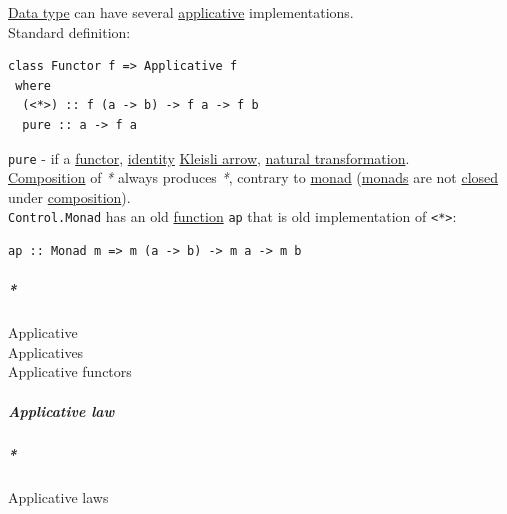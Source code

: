 \documentclass[11pt]{article}
\begin{document}
\hyperref[org965cde3]{Data type} can have several \hyperref[org24a6930]{applicative} implementations.\\

Standard definition:\\
\begin{verbatim}
class Functor f => Applicative f
 where
  (<*>) :: f (a -> b) -> f a -> f b
  pure :: a -> f a
\end{verbatim}

\texttt{pure} - if a \hyperref[org6073683]{functor}, \hyperref[org3bbbadd]{identity} \hyperref[org4db73e5]{Kleisli arrow}, \hyperref[org381dd2b]{natural transformation}.\\

\hyperref[org24a8abd]{Composition} of \emph{*} always produces \emph{*}, contrary to \hyperref[org268aaf1]{monad} (\hyperref[org3ecde32]{monads} are not \hyperref[orgfa67abb]{closed} under \hyperref[org24a8abd]{composition}).\\

\texttt{Control.Monad} has an old \hyperref[orgeb5cddb]{function} \texttt{ap} that is old implementation of \texttt{<*>}:\\
\begin{verbatim}
ap :: Monad m => m (a -> b) -> m a -> m b
\end{verbatim}

\subparagraph{\emph{*}}
\label{sec:org6ab6e29}

\label{org24a6930}Applicative\\
\label{org49971fd}Applicatives\\
\label{orgc278c79}Applicative functors\\

\subparagraph{\label{orgf98e888}Applicative law}
\label{sec:orgdac3238}

\subparagraph{\emph{*}}
\label{sec:orgd2e3622}
\label{org3153906}Applicative laws\\
\end{document}
